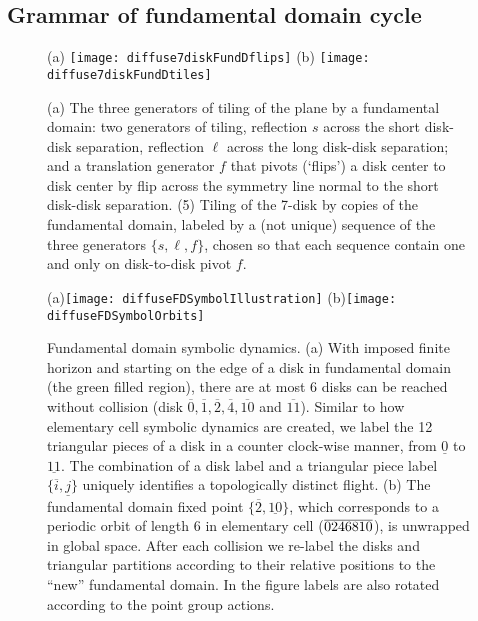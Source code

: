 \documentclass[aps,pre,
                showpacs,
                twocolumn,
                groupedaddress,
                floatfix]{revtex4-1}
\begin{document}
\subsection{Grammar of fundamental domain cycle}

\begin{figure}[htbp]
  \begin{center}
    (a) \texttt{[image: diffuse7diskFundDflips]}
    (b) \texttt{[image: diffuse7diskFundDtiles]}
  \end{center}
  \caption{\label{fig-7diskFundDflips} (a) The three generators of tiling of the  plane by a fundamental domain: two generators of  tiling, reflection  $s$ across the short disk-disk separation, reflection $\ell$ across the long  disk-disk separation; and a translation generator $f$ that pivots (`flips') a  disk center to disk center by flip across the symmetry line normal to the short disk-disk separation. (5) Tiling of the 7-disk by copies of the fundamental domain, labeled by a (not unique) sequence of the three generators  $\{s,\ell,f\}$, chosen so that each sequence contain one and only on  disk-to-disk pivot $f$. }
\end{figure}

\begin{figure}[htbp]
  (a)\texttt{[image: diffuseFDSymbolIllustration]}
  (b)\texttt{[image: diffuseFDSymbolOrbits]}

  \caption{\label{fig-fdflights} Fundamental domain symbolic dynamics. (a) With  imposed finite horizon and starting on the edge of a disk in fundamental  domain (the green filled region), there are at most 6 disks can be reached  without collision (disk  $\overline{0},\overline{1},\overline{2},\overline{4},\overline{10}$ and  $\overline{11}$). Similar to how elementary cell symbolic dynamics are  created, we label the 12 triangular pieces of a disk in a counter clock-wise  manner, from $\underline{0}$ to $\underline{11}$. The combination of a disk  label and a triangular piece label $\{\overline{i},\underline{j}\}$ uniquely  identifies a topologically distinct flight. (b) The fundamental domain fixed   point $\{\overline{2},\underline{10}\}$, which corresponds to a periodic   orbit of length 6 in elementary cell (${\overline{0246810}}$), is unwrapped in   global space. After each collision we re-label the disks and triangular   partitions according to their relative positions to the ``new'' fundamental   domain. In the figure labels are also rotated according to the point   group actions.}
\end{figure}
\end{document}
